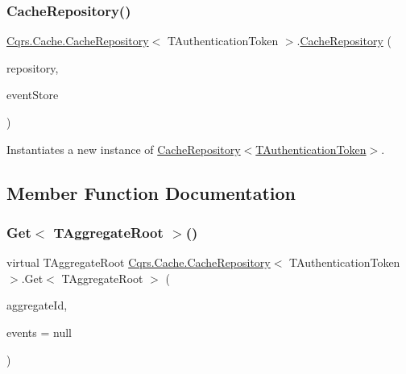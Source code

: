 \subsubsection{\texorpdfstring{Cache\+Repository()}{CacheRepository()}}
{\footnotesize\ttfamily \hyperlink{classCqrs_1_1Cache_1_1CacheRepository}{Cqrs.\+Cache.\+Cache\+Repository}$<$ T\+Authentication\+Token $>$.\hyperlink{classCqrs_1_1Cache_1_1CacheRepository}{Cache\+Repository} (\begin{DoxyParamCaption}\item[{\hyperlink{interfaceCqrs_1_1Domain_1_1IAggregateRepository}{I\+Aggregate\+Repository}$<$ T\+Authentication\+Token $>$}]{repository,  }\item[{\hyperlink{interfaceCqrs_1_1Events_1_1IEventStore}{I\+Event\+Store}$<$ T\+Authentication\+Token $>$}]{event\+Store }\end{DoxyParamCaption})}



Instantiates a new instance of \hyperlink{classCqrs_1_1Cache_1_1CacheRepository_a6c567e999a85f5803a920ce4912833a9_a6c567e999a85f5803a920ce4912833a9}{Cache\+Repository$<$\+T\+Authentication\+Token$>$}. 



\subsection{Member Function Documentation}
\mbox{\label{classCqrs_1_1Cache_1_1CacheRepository_a037acba636aedf23ff376ac0b749ec0c_a037acba636aedf23ff376ac0b749ec0c}} 
\subsubsection{\texorpdfstring{Get$<$ T\+Aggregate\+Root $>$()}{Get< TAggregateRoot >()}}
{\footnotesize\ttfamily virtual T\+Aggregate\+Root \hyperlink{classCqrs_1_1Cache_1_1CacheRepository}{Cqrs.\+Cache.\+Cache\+Repository}$<$ T\+Authentication\+Token $>$.Get$<$ T\+Aggregate\+Root $>$ (\begin{DoxyParamCaption}\item[{Guid}]{aggregate\+Id,  }\item[{I\+List$<$ \hyperlink{interfaceCqrs_1_1Events_1_1IEvent}{I\+Event}$<$ T\+Authentication\+Token $>$$>$}]{events = {\ttfamily null} }\end{DoxyParamCaption})\hspace{0.3cm}{\ttfamily [virtual]}}



